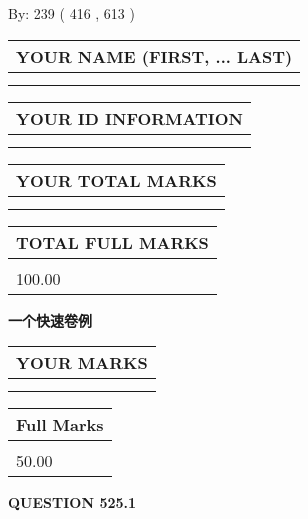 \documentclass{ctexart}
\begin{document}
   
\hspace{1.0in} By: 
 239 ( 416 ,  613 )
   
   
   
   
\newpage 
\setcounter{page}{ 
   525001 } 
   
   
   
   
\noindent\begin{tabular}{|l|}
\hline
YOUR NAME (FIRST, ... LAST)  \\
\hline
 \\ 
 \\ 
\hline
\end{tabular}
\hspace{0.05in} \begin{tabular}{|l|}
\hline
 YOUR   ID   INFORMATION  \\
\hline
 \\ 
 \\ 
\hline
\end{tabular}
   
   
\vspace{0.2in}\noindent\begin{tabular}{|l|}
\hline
YOUR TOTAL MARKS  \\
\hline
 \\ 
 \\ 
\hline
\end{tabular}
\hspace{0.05in} \begin{tabular}{|l|}
\hline
TOTAL FULL MARKS  \\
\hline
 \\ 
100.00 \\
\hline
\end{tabular}
   
   
 \vspace{0.2in}
{\LARGE {\textbf{ 一个快速卷例}}}
   
   
  
\vspace{0.2in}
  
\noindent\begin{tabular}{|l|}
\hline
 YOUR MARKS  \\
\hline
 \\ 
 \\ 
\hline
\end{tabular}
\hspace{0.05in} \begin{tabular}{|l|}
\hline
 Full Marks  \\
\hline
 \\ 
50.00 \\
\hline
\end{tabular}
{\textbf{\Large{QUESTION
525.1 
}}}
  
\end{document}
